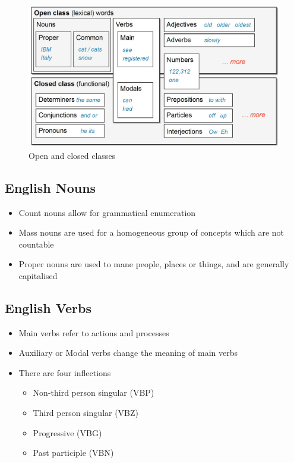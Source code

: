 \documentclass[11pt]{article}
\begin{document}
\begin{figure}[H]
	\centering
	\includegraphics[width=0.9\linewidth]{img/open_close_classes}
	\caption{Open and closed classes}
	\label{fig:opencloseclasses}
\end{figure}

\subsection{English Nouns}
\begin{itemize}
	\item Count nouns allow for grammatical enumeration
	\item Mass nouns are used for a homogeneous group of concepts which are not countable
	\item Proper nouns are used to mane people, places or things, and are generally capitalised
\end{itemize}

\subsection{English Verbs}
\begin{itemize}
	\item Main verbs refer to actions and processes
	\item Auxiliary or Modal verbs change the meaning of main verbs
	\item There are four inflections
	\begin{itemize}
		\item Non-third person singular (VBP)
		\item Third person singular (VBZ)
		\item Progressive (VBG)
		\item Past participle (VBN)
	\end{itemize}
\end{itemize}
\end{document}

